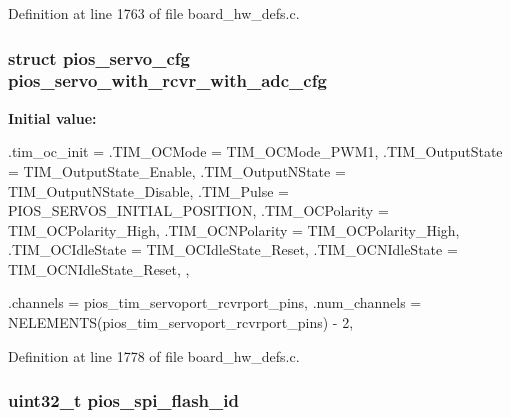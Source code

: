 \-Definition at line 1763 of file board\-\_\-hw\-\_\-defs.\-c.

\hypertarget{group___quanton_gaed77c96c690e403837b69dc13dcc4a1b}{
\subsubsection[{pios\-\_\-servo\-\_\-with\-\_\-rcvr\-\_\-with\-\_\-adc\-\_\-cfg}]{\setlength{\rightskip}{0pt plus 5cm}struct {\bf pios\-\_\-servo\-\_\-cfg} {\bf pios\-\_\-servo\-\_\-with\-\_\-rcvr\-\_\-with\-\_\-adc\-\_\-cfg}}}\label{group___quanton_gaed77c96c690e403837b69dc13dcc4a1b}
{\bfseries \-Initial value\-:}
\begin{DoxyCode}
 {
        .tim_oc_init = {
                .TIM_OCMode = TIM_OCMode_PWM1,
                .TIM_OutputState = TIM_OutputState_Enable,
                .TIM_OutputNState = TIM_OutputNState_Disable,
                .TIM_Pulse = PIOS_SERVOS_INITIAL_POSITION,
                .TIM_OCPolarity = TIM_OCPolarity_High,
                .TIM_OCNPolarity = TIM_OCPolarity_High,
                .TIM_OCIdleState = TIM_OCIdleState_Reset,
                .TIM_OCNIdleState = TIM_OCNIdleState_Reset,
        },
        
        .channels = pios_tim_servoport_rcvrport_pins,
        .num_channels = NELEMENTS(pios_tim_servoport_rcvrport_pins) - 2,
}
\end{DoxyCode}


\-Definition at line 1778 of file board\-\_\-hw\-\_\-defs.\-c.

\hypertarget{group___quanton_gaebc54f2c5fc298fad979df4d9bd1414b}{
\subsubsection[{pios\-\_\-spi\-\_\-flash\-\_\-id}]{\setlength{\rightskip}{0pt plus 5cm}uint32\-\_\-t {\bf pios\-\_\-spi\-\_\-flash\-\_\-id}}}\label{group___quanton_gaebc54f2c5fc298fad979df4d9bd1414b}


